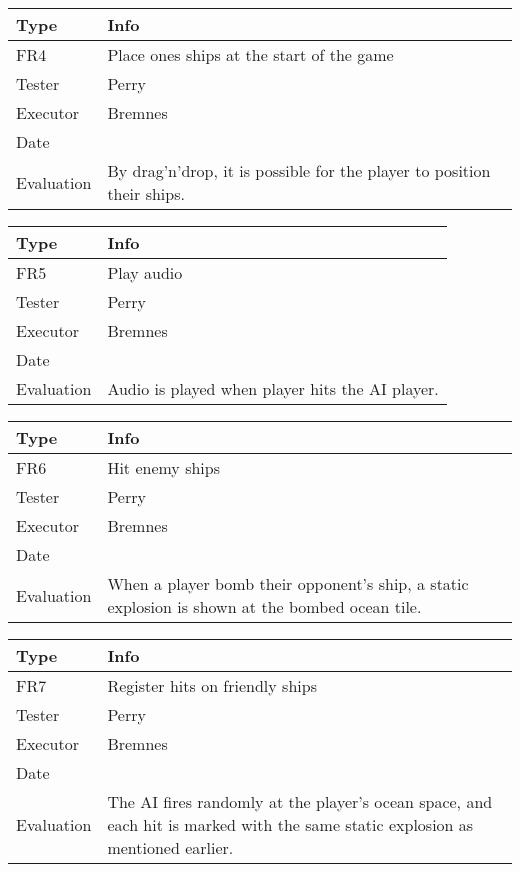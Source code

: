 \vspace{0.5em}

\noindent
\begin{tabular}{|p{2cm}|p{9.5cm}|}
	\hline
	\bf{Type}	& \bf{Info} \\
	\hline
	FR4			& Place ones ships at the start of the game \\
	Tester		& Perry \\
	Executor	& Bremnes \\
	Date		& \date{\today} \\
	Evaluation	& By drag'n'drop, it is possible for the player to position their ships. \\
	\hline
\end{tabular}

\vspace{0.5em}

\noindent
\begin{tabular}{|p{2cm}|p{9.5cm}|}
	\hline
	\bf{Type}	& \bf{Info} \\
	\hline
	FR5			& Play audio \\
	Tester		& Perry \\
	Executor	& Bremnes \\
	Date		& \date{\today} \\
	Evaluation	& Audio is played when player hits the AI player. \\
	\hline
\end{tabular}

\vspace{0.5em}

\noindent
\begin{tabular}{|p{2cm}|p{9.5cm}|}
	\hline
	\bf{Type}	& \bf{Info} \\
	\hline
	FR6			& Hit enemy ships \\
	Tester		& Perry \\
	Executor	& Bremnes \\
	Date		& \date{\today} \\
	Evaluation	& When a player bomb their opponent's ship, a static explosion is shown at the bombed ocean tile. \\
	\hline
\end{tabular}

\vspace{0.5em}

\noindent
\begin{tabular}{|p{2cm}|p{9.5cm}|}
	\hline
	\bf{Type}	& \bf{Info} \\
	\hline
	FR7			& Register hits on friendly ships \\
	Tester		& Perry \\
	Executor	& Bremnes \\
	Date		& \date{\today} \\
	Evaluation	& The AI fires randomly at the player's ocean space, and each hit is marked with the same static explosion as mentioned earlier. \\
	\hline
\end{tabular}

